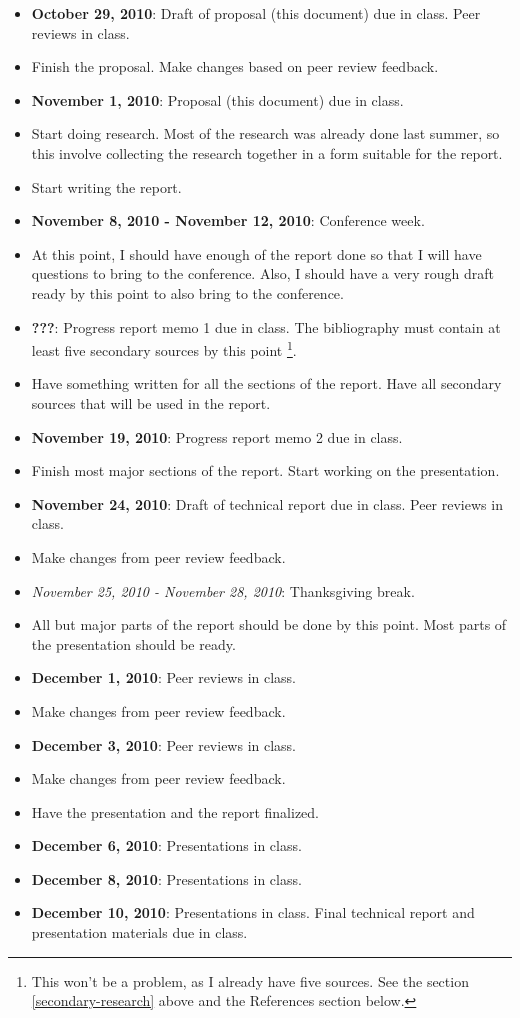 \documentclass[12pt]{article}
\begin{document}
\begin{itemize}
\item \textbf{October 29, 2010}: Draft of proposal (this document) due
in class.  Peer reviews in class.
\item Finish the proposal.  Make changes based on peer review feedback.  
\item \textbf{November 1, 2010}: Proposal (this document) due in class. 
\item Start doing research.  Most of the research was already done last
summer, so this involve collecting the research together in a form
suitable for the report.
\item Start writing the report.  
\item \textbf{November 8, 2010 - November 12, 2010}: Conference week. 
\item At this point, I should have enough of the report done so that I
will have questions to bring to the conference.  Also, I should have a
very rough draft ready by this point to also bring to the conference.
\item \textbf{???}: Progress report memo 1 due in class.  The
bibliography must contain at least five secondary sources by this point
\footnote{This won't be a problem, as I already have five sources.  See
the section \ref{secondary-research} above and the References section
below.}.
\item Have something written for all the sections of the report.  Have
all secondary sources that will be used in the report.
\item \textbf{November 19, 2010}: Progress report memo 2 due in class.
\item Finish most major sections of the report.  Start working on the
presentation.
\item \textbf{November 24, 2010}: Draft of technical report due in
class.  Peer reviews in class.
\item Make changes from peer review feedback.
\item \textit{November 25, 2010 - November 28, 2010}: Thanksgiving break.
\item All but major parts of the report should be done by this point. 
Most parts of the presentation should be ready.
\item \textbf{December 1, 2010}: Peer reviews in class.
\item Make changes from peer review feedback.
\item \textbf{December 3, 2010}: Peer reviews in class.
\item Make changes from peer review feedback.
\item Have the presentation and the report finalized.
\item \textbf{December 6, 2010}: Presentations in class.
\item \textbf{December 8, 2010}: Presentations in class.
\item \textbf{December 10, 2010}: Presentations in class.  Final
technical report and presentation materials due in class.
\end{itemize}
\end{document}
